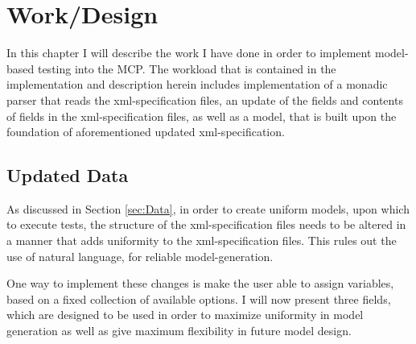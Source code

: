\chapter{Work/Design}

In this chapter I will describe the work I have done in order to implement model-based testing into the MCP. The workload that is contained in the implementation and description herein includes implementation of a monadic parser that reads the xml-specification files, an update of the fields and contents of fields in the xml-specification files, as well as a model, that is built upon the foundation of aforementioned updated xml-specification.
\section{Updated Data}

As discussed in Section \ref{sec:Data}, in order to create uniform models, upon which to execute tests, the structure of the xml-specification files needs to be altered in a manner that adds uniformity to the xml-specification files. This rules out the use of natural language, for reliable model-generation.

One way to implement these changes is make the user able to assign variables, based on a fixed collection of available options. I will now present three fields, which are designed to be used in order to maximize uniformity in model generation as well as give maximum flexibility in future model design.

